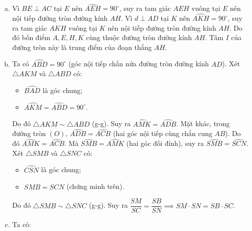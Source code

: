 \begin{bt}
{\begin{center}
\end{center}
\begin{enumerate}[a)]
	\item Vì $BE \perp AC$ tại $E$ nên $\widehat{AEH} = 90^\circ$, suy ra tam giác $AEH$ vuông tại $E$ nên nội tiếp đường tròn đường kính $AH$.
	Vì $d \perp AD$ tại $K$ nên $\widehat{AKH} = 90^\circ$, suy ra tam giác $AKH$ vuông tại $K$ nên nội tiếp đường tròn đường kính $AH$.
	Do đó bốn điểm $A, E, H, K$ cùng thuộc đường tròn đường kính $AH$.
	Tâm $I$ của đường tròn này là trung điểm của đoạn thẳng $AH$.
	\item Ta có $\widehat{ABD} = 90^\circ$ (góc nội tiếp chắn nửa đường tròn đường kính $AD$).
	Xét $\triangle AKM$ và $\triangle ABD$ có:
	\begin{itemize}
		\item $\widehat{BAD}$ là góc chung;
		\item $\widehat{AKM} = \widehat{ABD} = 90^\circ$.
	\end{itemize}
	Do đó $\triangle AKM \sim \triangle ABD$ (g-g).
	Suy ra $\widehat{AMK} = \widehat{ADB}$.
	Mặt khác, trong đường tròn $(O)$, $\widehat{ADB} = \widehat{ACB}$ (hai góc nội tiếp cùng chắn cung $AB$).
	Do đó $\widehat{AMK} = \widehat{ACB}$.
	Mà $\widehat{SMB} = \widehat{AMK}$ (hai góc đối đỉnh), suy ra $\widehat{SMB} = \widehat{SCN}$.
	Xét $\triangle SMB$ và $\triangle SNC$ có:
	\begin{itemize}
		\item $\widehat{CSN}$ là góc chung;
		\item $\widehat{SMB} = \widehat{SCN}$ (chứng minh trên).
	\end{itemize}
	Do đó $\triangle SMB \sim \triangle SNC$ (g-g).
	Suy ra $\dfrac{SM}{SC} = \dfrac{SB}{SN} \implies SM \cdot SN = SB \cdot SC$.
	\item Ta có:

\end{enumerate}}
\end{bt}
